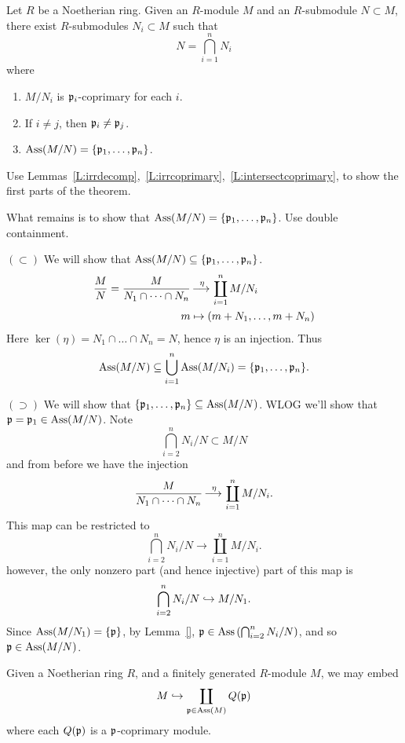 \documentclass{ximera}
\begin{document}
\begin{theorem}
  Let $R$ be a Noetherian ring. Given an $R$-module $M$ and an
  $R$-submodule $N\subset M$, there exist $R$-submodules $N_i\subset
  M$ such that
  \[
  N = \bigcap_{i=1}^n N_i
  \]
  where
  \begin{enumerate}
  \item $M/N_i$ is $\mathfrak{p}_i$-coprimary for each $i$.
  \item If $i\ne j$, then $\mathfrak{p}_i\ne\mathfrak{p}_j$.
  \item $\operatorname{Ass}(M/N) = \{\mathfrak{p}_1,\dots,\mathfrak{p}_n\}$.
  \end{enumerate}
  \begin{sketch}
    Use Lemmas~\ref{L:irrdecomp},~\ref{L:irrcoprimary},~\ref{L:intersectcoprimary},
    to show the first parts of the theorem.
    
    What remains is to show that $\operatorname{Ass}(M/N) =
    \{\mathfrak{p}_1,\dots,\mathfrak{p}_n\}$. Use double containment.
    
    $(\subset)$ We will show that $\operatorname{Ass}(M/N)
    \subseteq\{\mathfrak{p}_1,\dots,\mathfrak{p}_n\}$.
    \begin{align*}
      \frac{M}{N} = \frac{M}{N_1\cap\dots\cap N_n} &\mathop{\longrightarrow\,}\limits^\eta \coprod_{i=1}^n M/N_i\\
        m &\mapsto (m + N_1,\dots, m+ N_n)
    \end{align*}
    Here $\ker(\eta) = N_1\cap\dots\cap N_n = N$, hence $\eta$ is an
    injection. Thus
    \[
    \operatorname{Ass}(M/N) \subseteq \bigcup_{i=1}^n \operatorname{Ass}(M/N_i) = \{\mathfrak{p}_1,\dots,\mathfrak{p}_n\}.
    \]


    $(\supset)$ We will show that $\{\mathfrak{p}_1,\dots,\mathfrak{p}_n\} \subseteq
    \operatorname{Ass}(M/N)$. WLOG we'll show that $\mathfrak{p}=\mathfrak{p}_1\in\operatorname{Ass}(M/N)$. Note
    \[
    \bigcap_{i=2}^n N_i/N \subset M/N
    \]
    and from before we have the injection
    \[
    \frac{M}{N_1\cap\dots\cap N_n} \mathop{\longrightarrow\,}\limits^\eta \coprod_{i=1}^n M/N_i.
    \]
    This map can be restricted to
    \[
    \bigcap_{i=2}^n N_i/N \to \coprod_{i=1}^n M/N_i.
    \]
    however, the only nonzero part (and hence injective) part of this
    map is
    \[
    \bigcap_{i=2}^n N_i/N \hookrightarrow M/N_1.
    \]
    Since $\operatorname{Ass}(M/N_1) = \{\mathfrak{p}\}$, by Lemma~\ref{},
    $\mathfrak{p}\in\operatorname{Ass}\left(\bigcap_{i=2}^n N_i/N\right)$, and so
    $\mathfrak{p}\in\operatorname{Ass}(M/N)$.
  \end{sketch}
\end{theorem}





\begin{theorem}
  Given a Noetherian ring $R$, and a finitely generated $R$-module $M$, we may embed
  \[
  M\hookrightarrow \coprod_{\mathfrak{p}\in\operatorname{Ass}(M)} Q(\mathfrak{p})
  \]
  where each $Q(\mathfrak{p})$ is a $\mathfrak{p}$-coprimary module.
\end{theorem}
\end{document}
